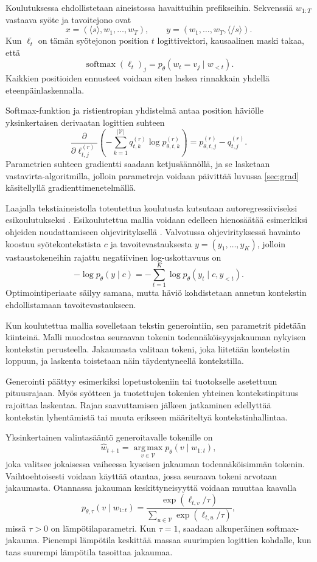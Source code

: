 Koulutuksessa ehdollistetaan aineistossa havaittuihin
prefikseihin. Sekvenssiä \(w_{1:T}\) vastaava syöte
ja tavoitejono ovat
$$
x=(\langle s \rangle,w_1,\dots,w_{T}),
\qquad
y=(w_1,\dots,w_T,\langle /s \rangle).
$$
Kun \(\ell_t\) on tämän syötejonon position \(t\)
logittivektori, kausaalinen maski takaa, että
$$
\operatorname{softmax}(\ell_t)_j
=
p_{\theta}(w_t=v_j\mid w_{<t}).
$$
Kaikkien positioiden ennusteet voidaan siten laskea
rinnakkain yhdellä eteenpäinlaskennalla.

Softmax-funktion ja ristientropian yhdistelmä antaa
position häviölle yksinkertaisen derivaatan logittien
suhteen
$$
\frac{\partial}
{\partial \ell_{t,j}^{(r)}}
\left(
  -\sum_{k=1}^{|\mathcal{V}|}
  q_{t,k}^{(r)}\log p_{\theta,t,k}^{(r)}
\right)
=
p_{\theta,t,j}^{(r)}-q_{t,j}^{(r)}.
$$
Parametrien suhteen gradientti saadaan ketjusäännöllä,
ja se lasketaan vastavirta-algoritmilla, jolloin parametreja voidaan päivittää luvussa \ref{sec:grad} käsitellyllä gradienttimenetelmällä.

Laajalla tekstiaineistolla toteutettua koulutusta
kutsutaan autoregressiiviseksi esikoulutukseksi
\cite{radford2018improving}. Esikoulutettua mallia
voidaan edelleen hienosäätää esimerkiksi ohjeiden
noudattamiseen ohjevirityksellä \cite{ouyang2022training}. Valvotussa ohjevirityksessä havainto
koostuu syötekontekstista \(c\) ja tavoitevastauksesta
\(y=(y_1,\dots,y_K)\), jolloin vastaustokeneihin
rajattu negatiivinen log-uskottavuus on
$$
-\log p_{\theta}(y\mid c)
=
-\sum_{t=1}^{K}
\log p_{\theta}(y_t\mid c,y_{<t}).
$$
Optimointiperiaate säilyy samana, mutta häviö
kohdistetaan annetun kontekstin ehdollistamaan
tavoitevastaukseen.

Kun koulutettua mallia sovelletaan tekstin generointiin,
sen parametrit pidetään kiinteinä. Malli muodostaa
seuraavan tokenin todennäköisyysjakauman nykyisen
kontekstin perusteella. Jakaumasta valitaan tokeni,
joka liitetään kontekstin loppuun, ja laskenta
toistetaan näin täydentyneellä kontekstilla.

Generointi päättyy esimerkiksi lopetustokeniin tai
tuotokselle asetettuun pituusrajaan. Myös syötteen ja
tuotettujen tokenien yhteinen kontekstinpituus rajoittaa
laskentaa. Rajan saavuttamisen jälkeen jatkaminen edellyttää
kontekstin lyhentämistä tai muuta erikseen määriteltyä
kontekstinhallintaa.

Yksinkertainen valintasääntö generoitavalle tokenille on
$$
\widehat{w}_{t+1}
=
\operatorname*{arg\,max}_{v \in \mathcal{V}}
p_{\theta}(v \mid w_{1:t}),
$$
joka valitsee jokaisessa vaiheessa kyseisen jakauman
todennäköisimmän tokenin.
Vaihtoehtoisesti voidaan käyttää otantaa,
jossa seuraava tokeni arvotaan jakaumasta. Otannassa jakauman keskittyneisyyttä voidaan muuttaa
kaavalla
$$
p_{\theta,\tau}(v \mid w_{1:t})
=
\frac{\exp(\ell_{t,v}/\tau)}
{\displaystyle\sum_{u \in \mathcal{V}}
\exp(\ell_{t,u}/\tau)},
$$
missä \(\tau>0\) on lämpötilaparametri. Kun \(\tau=1\), saadaan alkuperäinen softmax-jakauma.
Pienempi lämpötila keskittää massaa suurimpien logittien
kohdalle, kun taas suurempi lämpötila tasoittaa jakaumaa.

